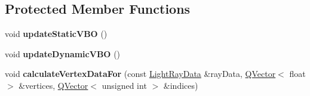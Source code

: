 \subsection*{Protected Member Functions}
\begin{DoxyCompactItemize}
\item 
\hypertarget{class_light_ray_renderer_a26948ed2a22fac94af809d293cecf135}{}void {\bfseries update\+Static\+V\+B\+O} ()\label{class_light_ray_renderer_a26948ed2a22fac94af809d293cecf135}

\item 
\hypertarget{class_light_ray_renderer_aa60b1a942ae0b926f4126836dc19ea21}{}void {\bfseries update\+Dynamic\+V\+B\+O} ()\label{class_light_ray_renderer_aa60b1a942ae0b926f4126836dc19ea21}

\item 
\hypertarget{class_light_ray_renderer_a6f7367b897a492fd021ea2ae43053cef}{}void {\bfseries calculate\+Vertex\+Data\+For} (const \hyperlink{class_light_ray_data}{Light\+Ray\+Data} \&ray\+Data, \hyperlink{class_q_vector}{Q\+Vector}$<$ float $>$ \&vertices, \hyperlink{class_q_vector}{Q\+Vector}$<$ unsigned int $>$ \&indices)\label{class_light_ray_renderer_a6f7367b897a492fd021ea2ae43053cef}

\end{DoxyCompactItemize}
